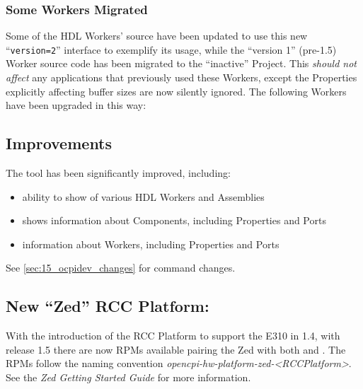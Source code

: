 \subsubsection*{Some Workers Migrated} %
\label{sec:15_v2_workers}
Some of the HDL Workers' source have been updated to use this new ``\texttt{version=2}'' interface to exemplify its usage, while the ``version 1'' (pre-1.5) Worker source code has been migrated to the ``inactive'' Project.
This \textit{should not affect} any applications that previously used these Workers, except the Properties explicitly affecting buffer sizes are now silently ignored.
The following Workers have been upgraded in this way:

\begin{itemize}
\setlength\itemsep{0em} %
\begin{multicols}{3}
\item[] 
\item[] 
\item[] 
\item[] 
\item[] 
\end{multicols}
\end{itemize}

\subsection{\ocpidev Improvements} %
\label{sec:15_ocpidev}
The \ocpidev tool has been significantly improved, including:
\begin{itemize}
\setlength\itemsep{0em} %
\item ability to show  of various HDL Workers and Assemblies %
\item {} shows information about Components, including Properties and Ports %
\item {} information about Workers, including Properties and Ports %
\end{itemize}
See \ref{sec:15_ocpidev_changes} for \ocpidev command changes.
\subsection{New ``Zed'' RCC Platform: } %
\label{sec:15_new_zed_rcc}
With the introduction of the RCC Platform  to support the E310 in 1.4, with release 1.5 there are now RPMs available pairing the Zed with both  and . The RPMs follow the naming convention \textit{opencpi-hw-platform-zed-\textless RCCPlatform\textgreater}. See the \textit{Zed Getting Started Guide} for more information.
